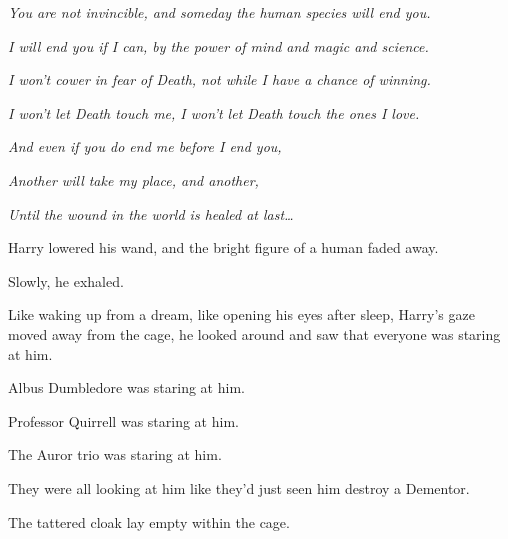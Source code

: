 \emph{You are not invincible, and someday the human species will end you.}

\emph{I will end you if I can, by the power of mind and magic and science.}

\emph{I won't cower in fear of Death, not while I have a chance of winning.}

\emph{I won't let Death touch me, I won't let Death touch the ones I love.}

\emph{And even if you do end me before I end you,}

\emph{Another will take my place, and another,}

\emph{Until the wound in the world is healed at last{\ldots}}

Harry lowered his wand, and the bright figure of a human faded away.

Slowly, he exhaled.

Like waking up from a dream, like opening his eyes after sleep, Harry's gaze 
moved away from the cage, he looked around and saw that everyone was staring at 
him.

Albus Dumbledore was staring at him.

Professor Quirrell was staring at him.

The Auror trio was staring at him.

They were all looking at him like they'd just seen him destroy a Dementor.

The tattered cloak lay empty within the cage.
